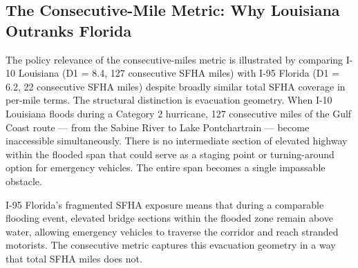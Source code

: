 \subsection{The Consecutive-Mile Metric: Why Louisiana Outranks Florida}

The policy relevance of the consecutive-miles metric is illustrated by comparing I-10
Louisiana (D1 = 8.4, 127 consecutive SFHA miles) with I-95 Florida (D1 = 6.2, 22
consecutive SFHA miles) despite broadly similar total SFHA coverage in per-mile terms.
The structural distinction is evacuation geometry. When I-10 Louisiana floods during a
Category 2 hurricane, 127 consecutive miles of the Gulf Coast route --- from the Sabine
River to Lake Pontchartrain --- become inaccessible simultaneously. There is no
intermediate section of elevated highway within the flooded span that could serve as a
staging point or turning-around option for emergency vehicles. The entire span becomes
a single impassable obstacle.

I-95 Florida's fragmented SFHA exposure means that during a comparable flooding event,
elevated bridge sections within the flooded zone remain above water, allowing emergency
vehicles to traverse the corridor and reach stranded motorists. The consecutive metric
captures this evacuation geometry in a way that total SFHA miles does not.
